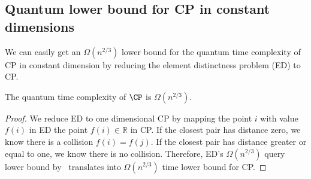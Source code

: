   



\subsection{Quantum lower bound for \textsf{CP} in constant dimensions}
\label{sec:cp-lo}
We can easily get an $\Omega(n^{2/3})$ lower bound for the quantum time complexity of \textsf{CP} in constant dimension by reducing the element distinctness problem (\textsf{ED}) to \textsf{CP}. 

\begin{theorem}[Folklore]\label{thm:cp_constant}
The quantum time complexity of $\CP$ is  $\Omega(n^{2/3})$.
\end{theorem}
\begin{proof}
We reduce \textsf{ED} to one dimensional \textsf{CP} by mapping the point $i$ with value $f(i)$ in  \textsf{ED}  the point $f(i) \in \mathbb{R}$ in \textsf{CP}. If the closest pair has distance zero, we know there is a collision $f(i)=f(j)$. If the closest pair has distance greater or equal to one, we know there is no collision. Therefore, \textsf{ED}'s  $\Omega(n^{2/3})$ query lower bound by~\cite{r1} translates into  $\Omega(n^{2/3})$ time lower bound  for \textsf{CP}.
\end{proof}
